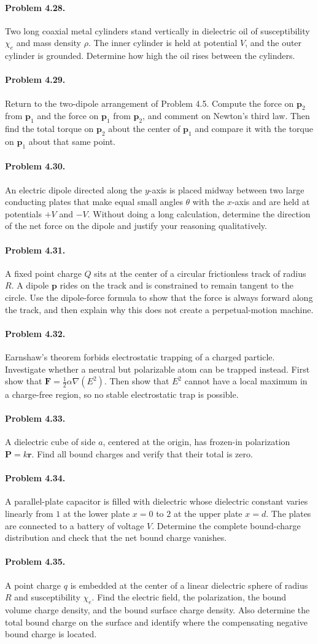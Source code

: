 \documentclass{aa}
\newcommand{\problemstatement}[2]{%
\paragraph{Problem #1.}#2\par\medskip
}
\begin{document}
\problemstatement{4.28}{Two long coaxial metal cylinders stand vertically in dielectric oil of susceptibility \(\chi_e\) and mass density \(\rho\). The inner cylinder is held at potential \(V\), and the outer cylinder is grounded. Determine how high the oil rises between the cylinders.}
\problemstatement{4.29}{Return to the two-dipole arrangement of Problem 4.5. Compute the force on \(\mathbf p_2\) from \(\mathbf p_1\) and the force on \(\mathbf p_1\) from \(\mathbf p_2\), and comment on Newton's third law. Then find the total torque on \(\mathbf p_2\) about the center of \(\mathbf p_1\) and compare it with the torque on \(\mathbf p_1\) about that same point.}
\problemstatement{4.30}{An electric dipole directed along the \(y\)-axis is placed midway between two large conducting plates that make equal small angles \(\theta\) with the \(x\)-axis and are held at potentials \(+V\) and \(-V\). Without doing a long calculation, determine the direction of the net force on the dipole and justify your reasoning qualitatively.}
\problemstatement{4.31}{A fixed point charge \(Q\) sits at the center of a circular frictionless track of radius \(R\). A dipole \(\mathbf p\) rides on the track and is constrained to remain tangent to the circle. Use the dipole-force formula to show that the force is always forward along the track, and then explain why this does not create a perpetual-motion machine.}
\problemstatement{4.32}{Earnshaw's theorem forbids electrostatic trapping of a charged particle. Investigate whether a neutral but polarizable atom can be trapped instead. First show that \(\mathbf F=\frac12\alpha\nabla(E^2)\). Then show that \(E^2\) cannot have a local maximum in a charge-free region, so no stable electrostatic trap is possible.}
\problemstatement{4.33}{A dielectric cube of side \(a\), centered at the origin, has frozen-in polarization \(\mathbf P=k\mathbf r\). Find all bound charges and verify that their total is zero.}
\problemstatement{4.34}{A parallel-plate capacitor is filled with dielectric whose dielectric constant varies linearly from \(1\) at the lower plate \(x=0\) to \(2\) at the upper plate \(x=d\). The plates are connected to a battery of voltage \(V\). Determine the complete bound-charge distribution and check that the net bound charge vanishes.}
\problemstatement{4.35}{A point charge \(q\) is embedded at the center of a linear dielectric sphere of radius \(R\) and susceptibility \(\chi_e\). Find the electric field, the polarization, the bound volume charge density, and the bound surface charge density. Also determine the total bound charge on the surface and identify where the compensating negative bound charge is located.}
\end{document}
